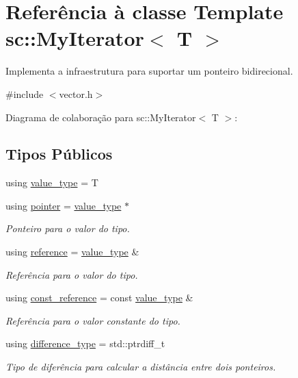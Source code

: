 \hypertarget{classsc_1_1MyIterator}{}\section{Referência à classe Template sc\+:\+:My\+Iterator$<$ T $>$}
\label{classsc_1_1MyIterator}


Implementa a infraestrutura para suportar um ponteiro bidirecional.  




{\ttfamily \#include $<$vector.\+h$>$}



Diagrama de colaboração para sc\+:\+:My\+Iterator$<$ T $>$\+:
\subsection*{Tipos Públicos}
\begin{DoxyCompactItemize}
\item 
using \hyperlink{classsc_1_1MyIterator_a87259a3ccf8ff488d496b658324c4b2d}{value\+\_\+type} = T
\item 
using \hyperlink{classsc_1_1MyIterator_aac55734d4d00af05ed90556dd8f8df0b}{pointer} = \hyperlink{classsc_1_1MyIterator_a87259a3ccf8ff488d496b658324c4b2d}{value\+\_\+type} $\ast$
\begin{DoxyCompactList}\small\item\em Ponteiro para o valor do tipo. \end{DoxyCompactList}\item 
using \hyperlink{classsc_1_1MyIterator_a713949524e31c23eade8ea3521c938ef}{reference} = \hyperlink{classsc_1_1MyIterator_a87259a3ccf8ff488d496b658324c4b2d}{value\+\_\+type} \&
\begin{DoxyCompactList}\small\item\em Referência para o valor do tipo. \end{DoxyCompactList}\item 
using \hyperlink{classsc_1_1MyIterator_ad8f5e1835e5247b500a08297a4f79a3c}{const\+\_\+reference} = const \hyperlink{classsc_1_1MyIterator_a87259a3ccf8ff488d496b658324c4b2d}{value\+\_\+type} \&
\begin{DoxyCompactList}\small\item\em Referência para o valor constante do tipo. \end{DoxyCompactList}\item 
using \hyperlink{classsc_1_1MyIterator_ab37e30d9d7abaca8b7ed9c4ba7371798}{difference\+\_\+type} = std\+::ptrdiff\+\_\+t
\begin{DoxyCompactList}\small\item\em Tipo de diferência para calcular a distância entre dois ponteiros. \end{DoxyCompactList}\end{DoxyCompactItemize}
